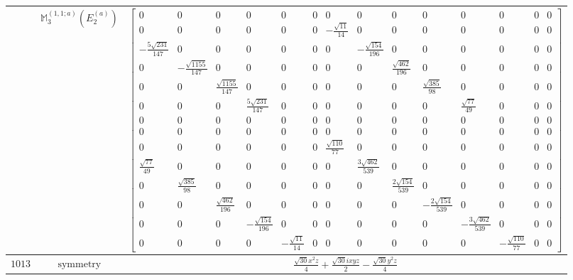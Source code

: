\documentclass[fleqn,8pt,landscape]{jsarticle}
\begin{document}
\begin{longtable}{ccc}
$  $ & $ \mathbb{M}_{3}^{(1,1;a)}(E_{2}^{(a)}) $ & $ \begin{bmatrix} 0 & 0 & 0 & 0 & 0 & 0 & 0 & 0 & 0 & 0 & 0 & 0 & 0 & 0 \\ 0 & 0 & 0 & 0 & 0 & 0 & - \frac{\sqrt{11}}{14} & 0 & 0 & 0 & 0 & 0 & 0 & 0 \\ - \frac{5 \sqrt{231}}{147} & 0 & 0 & 0 & 0 & 0 & 0 & - \frac{\sqrt{154}}{196} & 0 & 0 & 0 & 0 & 0 & 0 \\ 0 & - \frac{\sqrt{1155}}{147} & 0 & 0 & 0 & 0 & 0 & 0 & \frac{\sqrt{462}}{196} & 0 & 0 & 0 & 0 & 0 \\ 0 & 0 & \frac{\sqrt{1155}}{147} & 0 & 0 & 0 & 0 & 0 & 0 & \frac{\sqrt{385}}{98} & 0 & 0 & 0 & 0 \\ 0 & 0 & 0 & \frac{5 \sqrt{231}}{147} & 0 & 0 & 0 & 0 & 0 & 0 & \frac{\sqrt{77}}{49} & 0 & 0 & 0 \\ 0 & 0 & 0 & 0 & 0 & 0 & 0 & 0 & 0 & 0 & 0 & 0 & 0 & 0 \\ 0 & 0 & 0 & 0 & 0 & 0 & 0 & 0 & 0 & 0 & 0 & 0 & 0 & 0 \\ 0 & 0 & 0 & 0 & 0 & 0 & \frac{\sqrt{110}}{77} & 0 & 0 & 0 & 0 & 0 & 0 & 0 \\ \frac{\sqrt{77}}{49} & 0 & 0 & 0 & 0 & 0 & 0 & \frac{3 \sqrt{462}}{539} & 0 & 0 & 0 & 0 & 0 & 0 \\ 0 & \frac{\sqrt{385}}{98} & 0 & 0 & 0 & 0 & 0 & 0 & \frac{2 \sqrt{154}}{539} & 0 & 0 & 0 & 0 & 0 \\ 0 & 0 & \frac{\sqrt{462}}{196} & 0 & 0 & 0 & 0 & 0 & 0 & - \frac{2 \sqrt{154}}{539} & 0 & 0 & 0 & 0 \\ 0 & 0 & 0 & - \frac{\sqrt{154}}{196} & 0 & 0 & 0 & 0 & 0 & 0 & - \frac{3 \sqrt{462}}{539} & 0 & 0 & 0 \\ 0 & 0 & 0 & 0 & - \frac{\sqrt{11}}{14} & 0 & 0 & 0 & 0 & 0 & 0 & - \frac{\sqrt{110}}{77} & 0 & 0 \end{bmatrix} $ \\ \hline
$ 1013 $ & $ \text{symmetry} $ & $ \frac{\sqrt{30} x^{2} z}{4} + \frac{\sqrt{30} i x y z}{2} - \frac{\sqrt{30} y^{2} z}{4} $ \\

\end{longtable}
\end{document}

